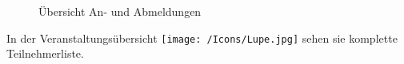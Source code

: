 \begin{figure}[H]
\caption{Übersicht An- und Abmeldungen}
\end{figure}

In der Veranstaltungsübersicht \texttt{[image: /Icons/Lupe.jpg]} sehen sie komplette Teilnehmerliste.




